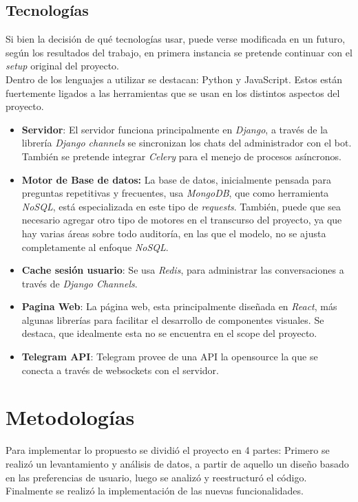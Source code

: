     \subsection{Tecnologías}
        Si bien la decisión de qué tecnologías usar, puede verse modificada en un futuro, según los resultados del trabajo, en primera instancia se pretende continuar con el \textit{setup} original del proyecto.\\
        Dentro de los lenguajes a utilizar se destacan: Python y JavaScript. Estos están fuertemente ligados a las herramientas que se usan en los distintos aspectos del proyecto.
        \begin{itemize}
            \item \textbf{Servidor}: El servidor funciona principalmente en \textit{\gls{Django}}, a través de la librería \textit{Django channels} se sincronizan los chats del administrador con el bot. También se pretende integrar \textit{\gls{Celery}} para el menejo de procesos asíncronos.
            \item \textbf{Motor de Base de datos:} La base de datos, inicialmente pensada para preguntas repetitivas y frecuentes, usa \textit{MongoDB}, que como herramienta \textit{NoSQL}, está especializada en este tipo de \textit{requests}. También, puede que sea necesario agregar otro tipo de motores en el transcurso del proyecto, ya que hay varias áreas sobre todo auditoría, en las que el modelo, no se ajusta completamente al enfoque \textit{NoSQL}.
            \item \textbf{Cache sesión usuario}: Se usa \textit{Redis}, para administrar las conversaciones a través de \textit{Django Channels}.
            \item \textbf{Pagina Web}: La página web, esta principalmente diseñada en \textit{React}, más algunas librerías para facilitar el desarrollo de componentes visuales. Se destaca, que idealmente esta no se encuentra en el scope del proyecto.
            \item \textbf{Telegram API}: Telegram provee de una API la opensource la que se conecta a través de websockets con el servidor.
        \end{itemize}

\section{Metodologías}\label{sec:intro-met}
    \par Para implementar lo propuesto se dividió el proyecto en 4 partes: Primero se realizó un levantamiento y análisis de datos, a partir de aquello un diseño basado en las preferencias de usuario, luego se analizó y reestructuró el código. Finalmente se realizó la implementación de las nuevas funcionalidades.

